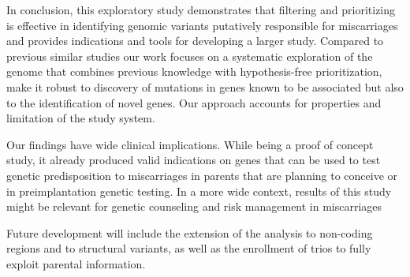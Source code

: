   
In conclusion, this exploratory study demonstrates that filtering and prioritizing is effective in identifying genomic variants putatively responsible for miscarriages and provides indications and tools for developing a larger study.  Compared to previous similar studies our work focuses on a systematic exploration of the genome that combines previous knowledge with hypothesis-free prioritization, make it robust to discovery of mutations in genes known to be associated but also to the identification of novel genes. Our approach accounts for properties and limitation of the study system.


Our findings have wide clinical implications. While being a proof of concept study, it already produced valid indications on genes that can be used to test genetic predisposition to miscarriages in parents that are planning to conceive or in preimplantation genetic testing. In a more wide context, results of this study might be relevant for genetic counseling and risk management in miscarriages


Future development will include the extension of the analysis to non-coding regions and to structural variants, as well as the enrollment of trios to fully exploit parental information.  










